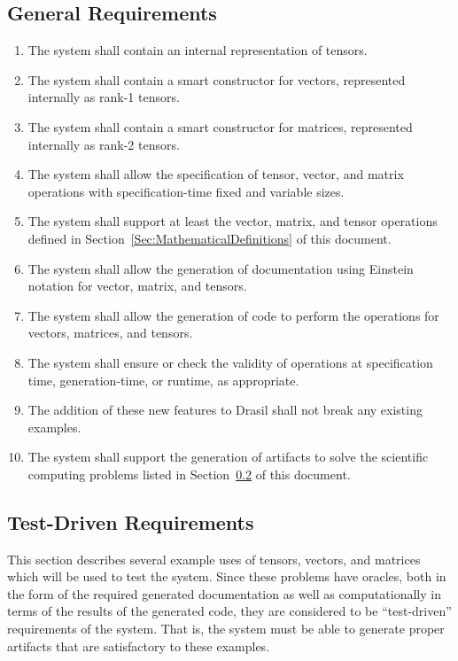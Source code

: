 \documentclass[12pt]{article}
\begin{document}
\subsection{General Requirements}

\begin{enumerate}[label={R\arabic*.}]
\item The system shall contain an internal representation of tensors.
\item The system shall contain a smart constructor for vectors, represented
      internally as rank-1 tensors.
\item The system shall contain a smart constructor for matrices, represented
      internally as rank-2 tensors.
\item The system shall allow the specification of tensor, vector, and
      matrix operations with specification-time fixed and variable sizes.
\item The system shall support at least the vector, matrix, and tensor operations
      defined in Section~\ref{Sec:MathematicalDefinitions} of this document.
\item The system shall allow the generation of documentation using Einstein
      notation for vector, matrix, and tensors.
\item The system shall allow the generation of code to perform the operations
      for vectors, matrices, and tensors.
\item The system shall ensure or check the validity of operations at specification 
      time, generation-time, or runtime, as appropriate.
\item The addition of these new features to Drasil shall not break any existing
      examples.
\item The system shall support the generation of artifacts to solve the scientific
      computing problems listed in Section~\ref{Subsec:TDR} of this document.
\end{enumerate}

\subsection{Test-Driven Requirements}\label{Subsec:TDR}
This section describes several example uses of tensors, vectors,
and matrices which will be used to test the system. Since these problems
have oracles, both in the form of the required generated documentation as well as
computationally in terms of the results of the generated code, they are considered
to be ``test-driven'' requirements of the system. That is, the system must be
able to generate proper artifacts that are satisfactory to these examples. 
\end{document}
